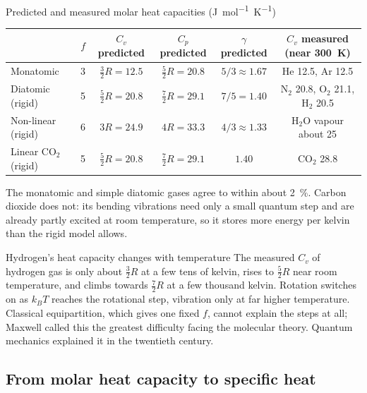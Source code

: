 \begin{tablebox}{Predicted and measured molar heat capacities (\si{J.mol^{-1}.K^{-1}})}
\centering
\begin{tabular}{@{}lccccc@{}}
\toprule
 & $f$ & $C_v$ predicted & $C_p$ predicted & $\gamma$ predicted & $C_v$ measured (near \SI{300}{K})\\
\midrule
Monatomic & 3 & $\tfrac32R = 12.5$ & $\tfrac52R=20.8$ & $5/3 \approx 1.67$ & He 12.5, Ar 12.5\\
Diatomic (rigid) & 5 & $\tfrac52R = 20.8$ & $\tfrac72R=29.1$ & $7/5 = 1.40$ & N$_2$ 20.8, O$_2$ 21.1, H$_2$ 20.5\\
Non-linear (rigid) & 6 & $3R=24.9$ & $4R=33.3$ & $4/3 \approx 1.33$ & H$_2$O vapour about 25\\
Linear CO$_2$ (rigid) & 5 & $\tfrac52R = 20.8$ & $\tfrac72R=29.1$ & $1.40$ & CO$_2$ 28.8\\
\bottomrule
\end{tabular}

\smallskip\raggedright
The monatomic and simple diatomic gases agree to within about \SI{2}{\percent}. Carbon dioxide does not:
its bending vibrations need only a small quantum step and are already partly excited at room temperature,
so it stores more energy per kelvin than the rigid model allows.
\end{tablebox}


\begin{remarkbox}{Hydrogen's heat capacity changes with temperature}
The measured $C_v$ of hydrogen gas is only about $\tfrac32R$ at a few tens of kelvin, rises to $\tfrac52R$ near
room temperature, and climbs towards $\tfrac72R$ at a few thousand kelvin. Rotation switches on as $k_BT$
reaches the rotational step, vibration only at far higher temperature. Classical equipartition, which
gives one fixed $f$, cannot explain the steps at all; Maxwell called this the greatest difficulty facing
the molecular theory. Quantum mechanics explained it in the twentieth century.
\end{remarkbox}

\subsection{From molar heat capacity to specific heat}

